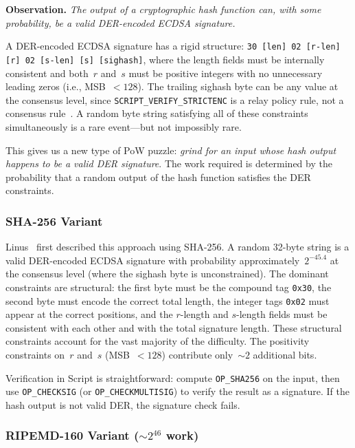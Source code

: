 \documentclass[11pt, a4paper]{article}
\begin{document}
\medskip
\noindent\textbf{Observation.} \textit{The output of a cryptographic hash function can, with some probability, be a valid DER-encoded ECDSA signature.}
\medskip

A DER-encoded ECDSA signature has a rigid structure: \texttt{30 [len] 02 [r-len] [r] 02 [s-len] [s] [sighash]}, where the length fields must be internally consistent and both~$r$ and~$s$ must be positive integers with no unnecessary leading zeros (i.e., MSB~$< 128$). The trailing sighash byte can be any value at the consensus level, since \texttt{SCRIPT\_VERIFY\_STRICTENC} is a relay policy rule, not a consensus rule~\cite[Section~2.4.2]{linus2024binohash}. A random byte string satisfying all of these constraints simultaneously is a rare event---but not impossibly rare.

This gives us a new type of PoW puzzle: \emph{grind for an input whose hash output happens to be a valid DER signature}. The work required is determined by the probability that a random output of the hash function satisfies the DER constraints.

\subsubsection{SHA-256 Variant}

Linus~\cite{linus2024sha2ecdsa} first described this approach using SHA-256. A random 32-byte string is a valid DER-encoded ECDSA signature with probability approximately~$2^{-45.4}$ at the consensus level (where the sighash byte is unconstrained). The dominant constraints are structural: the first byte must be the compound tag \texttt{0x30}, the second byte must encode the correct total length, the integer tags \texttt{0x02} must appear at the correct positions, and the $r$-length and $s$-length fields must be consistent with each other and with the total signature length. These structural constraints account for the vast majority of the difficulty. The positivity constraints on~$r$ and~$s$ (MSB~$< 128$) contribute only~${\sim}2$ additional bits.

Verification in Script is straightforward: compute \texttt{OP\_SHA256} on the input, then use \texttt{OP\_CHECKSIG} (or \texttt{OP\_CHECKMULTISIG}) to verify the result as a signature. If the hash output is not valid DER, the signature check fails.

\subsubsection{RIPEMD-160 Variant (${\sim}2^{46}$ work)}
\label{sec:ripemd-puzzle}
\end{document}
